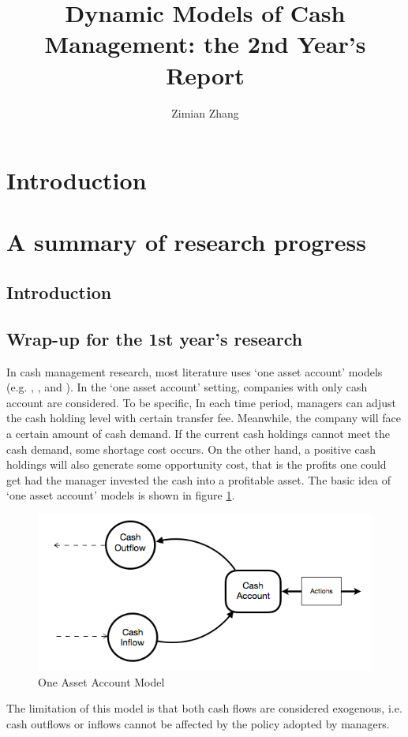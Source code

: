 \documentclass[12pt]{article}
\author{Zimian Zhang}
\title{Dynamic Models of Cash Management: the 2nd Year's Report}
\begin{document}
\maketitle
\setcounter{page}{0}
\thispagestyle{empty}


\newpage
\tableofcontents
\setcounter{page}{0}
\thispagestyle{empty}

\newpage

\section {Introduction}
\section{A summary of research progress}
\subsection{Introduction}




\subsection{Wrap-up for the 1st year's research}

In cash management research, most literature uses `one asset account' models (e.g. \cite{baccarin2002optimal}, \cite{sato2011stochastic}, \cite{bensoussan2005optimality} and \cite{feng2010computational}). In the `one asset account' setting, companies with only cash account are considered. To be specific, In each time period, managers can adjust the cash holding level with certain transfer fee. Meanwhile, the company will face a certain amount of cash demand. If the current cash holdings cannot meet the cash demand, some shortage cost occurs. On the other hand, a positive cash holdings will also generate some opportunity cost, that is the profits one could get had the manager invested the cash into a profitable asset. The basic idea of `one asset account' models is shown in figure \ref{basic model}.
\begin{figure}
\begin{center}
\includegraphics[scale=.6]{basicModel}
\end{center}
\caption{One Asset Account Model}
\label{basic model}
\end{figure}
The limitation of this model is that both cash flows are considered exogenous, i.e. cash outflows or inflows cannot be affected by the policy adopted by managers. 
\end{document}
